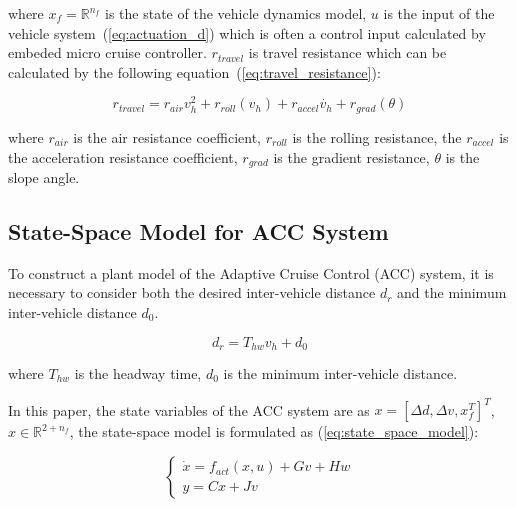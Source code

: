 \documentclass{article}
\numberwithin{equation}{section}
\begin{document}
\noindent where $x_f=\mathbb{R}^{n_{f}}$ is the state of the vehicle dynamics model, $u$ is the input of the
vehicle system~(\ref{eq:actuation_d}) which is often a control input calculated by embeded
micro cruise controller. $r_{travel}$ is travel resistance which can be calculated by the
following equation~(\ref{eq:travel_resistance}):

\begin{equation}
    r_{travel}=r_{air}v_h^2 + r_{roll}(v_h)+r_{accel}\dot{v_h}+r_{grad}(\theta)\label{eq:travel_resistance}
\end{equation}

\noindent where $r_{air}$ is the air resistance coefficient, $r_{roll}$ is the rolling resistance,
the $r_{accel}$ is the acceleration resistance coefficient, $r_{grad}$ is the gradient resistance,
$\theta$ is the slope angle.

\subsection{State-Space Model for ACC System}

To construct a plant model of the Adaptive Cruise Control (ACC) system, it is
necessary to consider both the desired inter-vehicle distance $d_r$ and the
minimum inter-vehicle distance $d_0$.

\begin{equation}
    d_r = T_{hw}v_h+d_0\label{eq:inter_vehicle_distance}
\end{equation}

\noindent where $T_{hw}$ is the headway time, $d_0$ is the minimum inter-vehicle distance.

In this paper, the state variables of the ACC system are as $x=[\Delta d,\Delta
    v,x_f^T]^T$, $x\in \mathbb{R}^{2+n_f}$, the state-space model is formulated as
(\ref{eq:state_space_model}):

\begin{equation}
    \left\{\begin{array}{l}\label{eq:state_space_model}
        \dot{x}=f_{a c t}\left(x, u\right) + Gv + Hw \\
        y=Cx+Jv
    \end{array}\right.
\end{equation}
\end{document}

